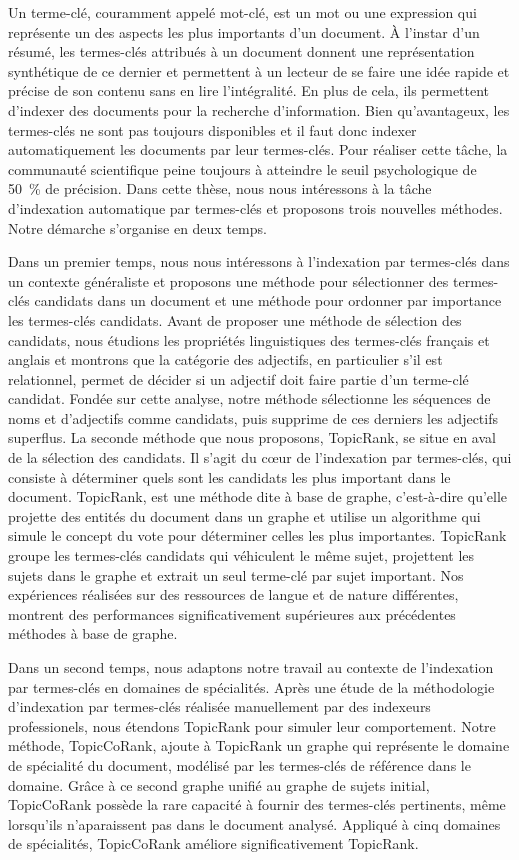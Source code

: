 Un terme-clé, couramment appelé mot-clé, est un mot ou une expression qui
représente un des aspects les plus importants d'un document. À l'instar d'un
résumé, les termes-clés attribués à un document donnent une représentation
synthétique de ce dernier et permettent à un lecteur de se faire une idée rapide
et précise de son contenu sans en lire l'intégralité. En plus de cela, ils
permettent d'indexer des documents pour la recherche d'information. Bien
qu'avantageux, les termes-clés ne sont pas toujours disponibles et il faut donc
indexer automatiquement les documents par leur termes-clés. Pour réaliser cette
tâche, la communauté scientifique peine toujours à atteindre le seuil
psychologique de 50~\% de précision. Dans cette thèse, nous nous intéressons à
la tâche d'indexation automatique par termes-clés et proposons trois nouvelles
méthodes. Notre démarche s'organise en deux temps.

Dans un premier temps, nous nous intéressons à l'indexation par termes-clés dans
un contexte généraliste et proposons une méthode pour sélectionner des
termes-clés candidats dans un document et une méthode pour ordonner par
importance les termes-clés candidats. Avant de proposer une méthode de sélection
des candidats, nous étudions les propriétés linguistiques des termes-clés
français et anglais et montrons que la catégorie des adjectifs, en particulier
s'il est relationnel, permet de décider si un adjectif doit faire partie d'un
terme-clé candidat. Fondée sur cette analyse, notre méthode sélectionne les
séquences de noms et d'adjectifs comme candidats, puis supprime de ces derniers
les adjectifs superflus. La seconde méthode que nous proposons, TopicRank, se
situe en aval de la sélection des candidats. Il s'agit du c\oe{}ur de
l'indexation par termes-clés, qui consiste à déterminer quels sont les candidats
les plus important dans le document. TopicRank, est une méthode dite \og{}à base
de graphe\fg{}, c'est-à-dire qu'elle projette des entités du document dans un
graphe et utilise un algorithme qui simule le concept du vote pour déterminer
celles les plus importantes. TopicRank groupe les termes-clés candidats qui
véhiculent le même sujet, projettent les sujets dans le graphe et extrait un
seul terme-clé par sujet important. Nos expériences réalisées sur des ressources
de langue et de nature différentes, montrent des performances significativement
supérieures aux précédentes méthodes \og{}à base de graphe\fg{}.

Dans un second temps, nous adaptons notre travail au contexte de l'indexation
par termes-clés en domaines de spécialités. Après une étude de la méthodologie
d'indexation par termes-clés réalisée manuellement par des indexeurs
professionels, nous étendons TopicRank pour simuler leur comportement. Notre
méthode, TopicCoRank, ajoute à TopicRank un graphe qui représente le domaine de
spécialité du document, modélisé par les termes-clés de référence dans le
domaine. Grâce à ce second graphe unifié au graphe de sujets initial,
TopicCoRank possède la rare capacité à fournir des termes-clés pertinents, même
lorsqu'ils n'aparaissent pas dans le document analysé. Appliqué à cinq domaines
de spécialités, TopicCoRank améliore significativement TopicRank.

